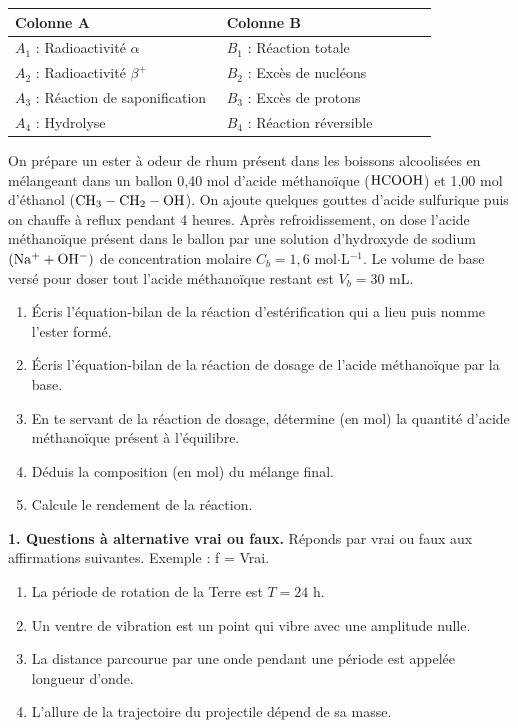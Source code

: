 \documentclass[11pt]{article}
\begin{document}
\begin{center}\renewcommand{\arraystretch}{1.6}
\begin{tabular}{|p{0.42\linewidth}|p{0.42\linewidth}|}
\hline
\textbf{Colonne A} & \textbf{Colonne B} \\
\hline
$A_1$ : Radioactivité $\alpha$ & $B_1$ : Réaction totale \\
\hline
$A_2$ : Radioactivité $\beta^+$ & $B_2$ : Excès de nucléons \\
\hline
$A_3$ : Réaction de saponification & $B_3$ : Excès de protons \\
\hline
$A_4$ : Hydrolyse & $B_4$ : Réaction réversible \\
\hline
\end{tabular}
\end{center}

On prépare un ester à odeur de rhum présent dans les boissons alcoolisées en mélangeant dans un ballon 0,40 mol d'acide méthanoïque ($\mathrm{HCOOH}$) et 1,00 mol d'éthanol ($\mathrm{CH_3-CH_2-OH}$). On ajoute quelques gouttes d'acide sulfurique puis on chauffe à reflux pendant 4 heures. Après refroidissement, on dose l'acide méthanoïque présent dans le ballon par une solution d'hydroxyde de sodium $(\mathrm{Na^+} + \mathrm{OH^-})$ de concentration molaire $C_b = 1{,}6$ mol$\cdot$L$^{-1}$. Le volume de base versé pour doser tout l'acide méthanoïque restant est $V_b = 30$ mL.

\begin{enumerate}
  \item Écris l'équation-bilan de la réaction d'estérification qui a lieu puis nomme l'ester formé.
  \item Écris l'équation-bilan de la réaction de dosage de l'acide méthanoïque par la base.
  \item En te servant de la réaction de dosage, détermine (en mol) la quantité d'acide méthanoïque présent à l'équilibre.
  \item Déduis la composition (en mol) du mélange final.
  \item Calcule le rendement de la réaction.
\end{enumerate}



\noindent\textbf{1. Questions à alternative vrai ou faux.} Réponds par vrai ou faux aux affirmations suivantes. Exemple : f = Vrai.
\begin{enumerate}[label=\alph*.]
  \item La période de rotation de la Terre est $T = 24$ h.
  \item Un ventre de vibration est un point qui vibre avec une amplitude nulle.
  \item La distance parcourue par une onde pendant une période est appelée longueur d'onde.
  \item L'allure de la trajectoire du projectile dépend de sa masse.
\end{enumerate}
\end{document}
